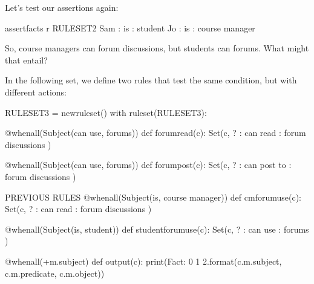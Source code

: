 \documentclass[letterpaper,10pt,english]{sphinxmanual}
\begin{document}
Let’s test our assertions again:

{
\begin{sphinxVerbatim}[commandchars=\\\{\}]
\llap{\color{nbsphinxin}[ ]:\,\hspace{\fboxrule}\hspace{\fboxsep}}\PYGZpc{}\PYGZpc{}assert\PYGZus{}facts \PYGZhy{}r RULESET\PYGZus{}2
Sam : is : student
Jo : is : course manager
\end{sphinxVerbatim}
}

So, course managers can  forum discussions, but students can  forums. What might that entail?

In the following set, we define two rules that test the same condition, but with different actions:

{
\begin{sphinxVerbatim}[commandchars=\\\{\}]
\llap{\color{nbsphinxin}[ ]:\,\hspace{\fboxrule}\hspace{\fboxsep}}RULESET\PYGZus{}3 = new\PYGZus{}ruleset()
with ruleset(RULESET\PYGZus{}3):

    @when\PYGZus{}all(Subject(\PYGZdq{}can use\PYGZdq{}, \PYGZdq{}forums\PYGZdq{}))
    def forum\PYGZus{}read(c):
        Set(c, \PYGZsq{}? : can read : forum discussions\PYGZsq{} )

    @when\PYGZus{}all(Subject(\PYGZdq{}can use\PYGZdq{}, \PYGZdq{}forums\PYGZdq{}))
    def forum\PYGZus{}post(c):
        Set(c, \PYGZsq{}? : can post to : forum discussions\PYGZsq{} )


    \PYGZsh{} \PYGZhy{}\PYGZhy{} PREVIOUS RULES \PYGZhy{}\PYGZhy{}
    @when\PYGZus{}all(Subject(\PYGZdq{}is\PYGZdq{}, \PYGZdq{}course manager\PYGZdq{}))
    def cm\PYGZus{}forum\PYGZus{}use(c):
        Set(c, \PYGZsq{}? : can read : forum discussions\PYGZsq{} )

    @when\PYGZus{}all(Subject(\PYGZdq{}is\PYGZdq{}, \PYGZdq{}student\PYGZdq{}))
    def student\PYGZus{}forum\PYGZus{}use(c):
        Set(c, \PYGZsq{}? : can use : forums\PYGZsq{} )

    @when\PYGZus{}all(+m.subject)
    def output(c):
        print(\PYGZsq{}Fact: \PYGZob{}0\PYGZcb{} \PYGZob{}1\PYGZcb{} \PYGZob{}2\PYGZcb{}\PYGZsq{}.format(c.m.subject, c.m.predicate, c.m.object))
\end{sphinxVerbatim}
}
\end{document}
